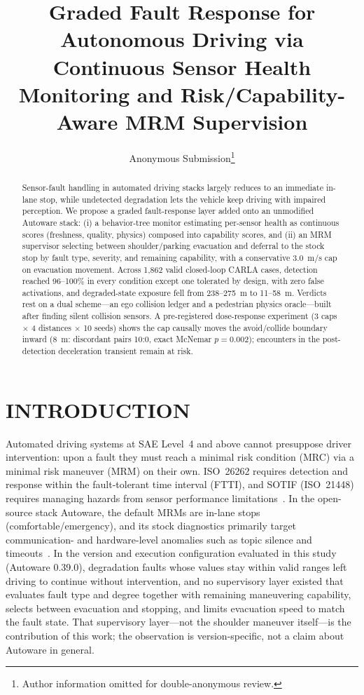 \documentclass[letterpaper, 10pt, conference]{ieeeconf}
\title{\LARGE \bf
Graded Fault Response for Autonomous Driving via Continuous Sensor Health
Monitoring and Risk/Capability-Aware MRM Supervision}
\author{Anonymous Submission\thanks{Author information omitted for
double-anonymous review.}}
\begin{document}
\maketitle
\thispagestyle{empty}
\pagestyle{empty}

\begin{abstract}
Sensor-fault handling in automated driving stacks largely reduces to an
immediate in-lane stop, while undetected degradation lets the vehicle keep
driving with impaired perception. We propose a graded fault-response layer
added onto an unmodified Autoware stack: (i) a behavior-tree monitor
estimating per-sensor health as continuous scores (freshness, quality,
physics) composed into capability scores, and (ii) an MRM
supervisor selecting between shoulder/parking evacuation and deferral to
the stock stop by fault type, severity, and remaining capability, with a
conservative 3.0~m/s cap on evacuation movement. Across 1{,}862 valid
closed-loop CARLA cases, detection reached 96--100\% in every condition
except one tolerated by design, with zero false activations, and
degraded-state exposure fell from 238--275~m to 11--58~m. Verdicts rest on a dual
scheme---an ego collision ledger and a pedestrian physics oracle---built
after finding silent collision sensors. A
pre-registered dose-response experiment (3 caps $\times$ 4 distances
$\times$ 10 seeds) shows the cap causally moves the avoid/collide boundary
inward (8~m: discordant pairs 10:0, exact McNemar $p=0.002$); encounters in
the post-detection deceleration transient remain at risk.
\end{abstract}

\section{INTRODUCTION}

Automated driving systems at SAE Level~4 and above cannot presuppose
driver intervention: upon a fault they must reach a minimal risk condition
(MRC) via a minimal risk maneuver (MRM) on their own. ISO~26262 requires
detection and response within the fault-tolerant time interval (FTTI), and
SOTIF (ISO~21448) requires managing hazards from sensor performance
limitations~\cite{iso26262,iso21448,j3016}. In the open-source stack
Autoware, the default MRMs are in-lane stops (comfortable/emergency), and its
stock diagnostics primarily target communication- and hardware-level
anomalies such as topic silence and timeouts~\cite{autoware}. In the version
and execution configuration evaluated in this study (Autoware 0.39.0),
degradation faults whose values stay within valid ranges left driving to
continue without intervention, and no supervisory layer existed that
evaluates fault type and degree together with remaining maneuvering
capability, selects between evacuation and stopping, and limits evacuation
speed to match the fault state. That supervisory layer---not the shoulder
maneuver itself---is the contribution of this work; the observation is
version-specific, not a claim about Autoware in general.
\end{document}
